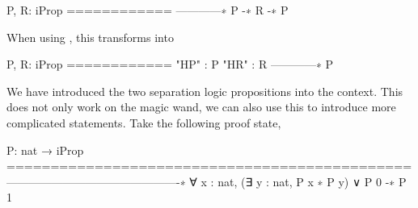 \documentclass[thesis.tex]{subfiles}
\begin{document}

\begin{coqcode}
  P, R: iProp
  ============
  ------------∗
  P -∗ R -∗ P
\end{coqcode}
When using , this transforms into
\begin{coqcode}
  P, R: iProp
  ============
  "HP" : P
  "HR" : R
  ------------∗
  P
\end{coqcode}
We have introduced the two separation logic propositions into the \iris context. This does not only work on the magic wand, we can also use this to introduce more complicated statements. Take the following proof state,
\begin{coqcode}
  P: nat → iProp
  ==============================================
  ----------------------------------------------∗
  ∀ x : nat, (∃ y : nat, P x ∗ P y) ∨ P 0 -∗ P 1
\end{coqcode}
\end{document}
